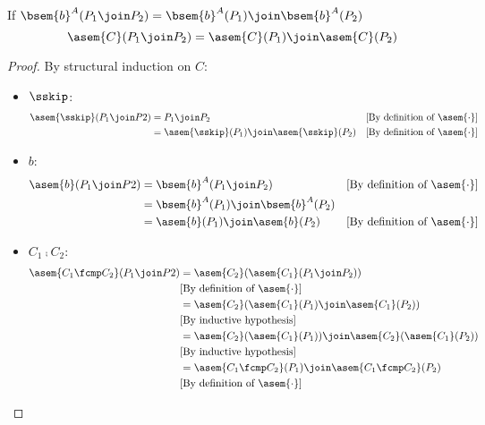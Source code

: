 \begin{theorem} $\;$\\
  \label{thm:additivity}
  If $\bsem{b}^A(P_1 \join P_2) = \bsem{b}^A(P_1) \join \bsem{b}^A(P_2)$
  $$\asem{C}(P_1 \join P_2) = \asem{C}(P_1) \join \asem{C}(P_2)$$
\end{theorem}
\begin{proof}
  By structural induction on $C$:
  \begin{itemize}
    \item $\sskip$:
      \begin{align*}
        \asem{\sskip}(P_1 \join P2)
          &= P_1 \join P_2 
          &\text{[By definition of $\asem{\cdot}$]} \\
          &= \asem{\sskip}(P_1) \join \asem{\sskip}(P_2)
          &\text{[By definition of $\asem{\cdot}$]} \\
      \end{align*}
    \item $b$:
      \begin{align*}
        \asem{b}(P_1 \join P2)
          &= \bsem{b}^A(P_1 \join P_2)
          &\text{[By definition of $\asem{\cdot}$]} \\
          &= \bsem{b}^A(P_1) \join \bsem{b}^A(P_2) \\
          &= \asem{b}(P_1) \join \asem{b}(P_2)
          &\text{[By definition of $\asem{\cdot}$]} \\
      \end{align*}
    \item $C_1 \fcmp C_2$:
      \begin{align*}
        \asem{C_1 \fcmp C_2}(P_1 \join P2)
          &= \asem{C_2}(\asem{C_1}(P_1 \join P_2)) \\
          &\text{[By definition of $\asem{\cdot}$]} \\
          &= \asem{C_2}(\asem{C_1}(P_1) \join \asem{C_1}(P_2)) \\
          &\text{[By inductive hypothesis]} \\
          &= \asem{C_2}(\asem{C_1}(P_1)) \join \asem{C_2}(\asem{C_1}(P_2)) \\
          &\text{[By inductive hypothesis]} \\
          &= \asem{C_1 \fcmp C_2}(P_1) \join \asem{C_1 \fcmp C_2}(P_2) \\
          &\text{[By definition of $\asem{\cdot}$]} \\
      \end{align*}

\end{itemize}
\end{proof}
